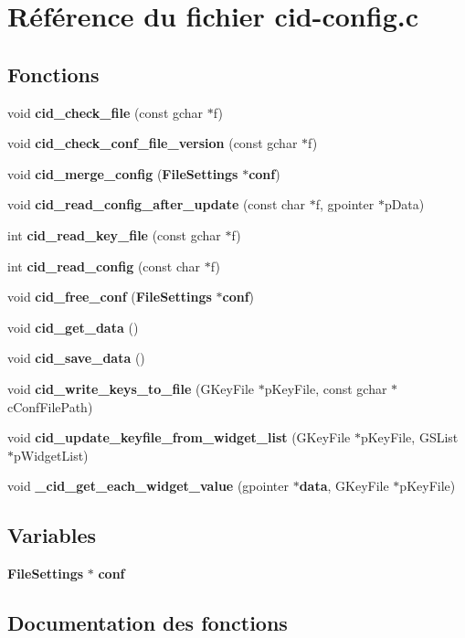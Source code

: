 \section{Référence du fichier cid-config.c}
\label{cid-config_8c}
\subsection*{Fonctions}
\begin{CompactItemize}
\item 
void {\bf cid\_\-check\_\-file} (const gchar $\ast$f)
\item 
void {\bf cid\_\-check\_\-conf\_\-file\_\-version} (const gchar $\ast$f)
\item 
void {\bf cid\_\-merge\_\-config} ({\bf FileSettings} $\ast${\bf conf})
\item 
void {\bf cid\_\-read\_\-config\_\-after\_\-update} (const char $\ast$f, gpointer $\ast$pData)
\item 
int {\bf cid\_\-read\_\-key\_\-file} (const gchar $\ast$f)
\item 
int {\bf cid\_\-read\_\-config} (const char $\ast$f)
\item 
void {\bf cid\_\-free\_\-conf} ({\bf FileSettings} $\ast${\bf conf})
\item 
void {\bf cid\_\-get\_\-data} ()
\item 
void {\bf cid\_\-save\_\-data} ()
\item 
void {\bf cid\_\-write\_\-keys\_\-to\_\-file} (GKeyFile $\ast$pKeyFile, const gchar $\ast$cConfFilePath)
\item 
void {\bf cid\_\-update\_\-keyfile\_\-from\_\-widget\_\-list} (GKeyFile $\ast$pKeyFile, GSList $\ast$pWidgetList)
\item 
void {\bf \_\-cid\_\-get\_\-each\_\-widget\_\-value} (gpointer $\ast${\bf data}, GKeyFile $\ast$pKeyFile)
\end{CompactItemize}
\subsection*{Variables}
\begin{CompactItemize}
\item 
{\bf FileSettings} $\ast$ {\bf conf}
\end{CompactItemize}


\subsection{Documentation des fonctions}
